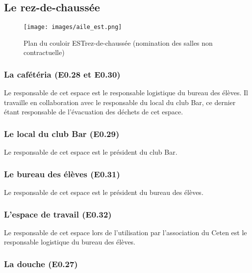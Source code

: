 \documentclass{article} %
\begin{document}
		\subsection{Le rez-de-chaussée}
\label{sub:le_rez_de_chaussee}

		\begin{figure}[]
			\centering
			\texttt{[image: images/aile\_est.png]}
			\caption{Plan du couloir EST\@ rez-de-chaussée (nomination des salles
			non contractuelle)}
\label{fig:plan}
		\end{figure}

			\subsubsection{La cafétéria (E0.28 et E0.30)}
\label{ssub:la_cafeteria_e0_28_et_e0_30_}

				Le responsable de cet espace est le responsable logistique du
				bureau des élèves. Il travaille en collaboration avec le
				responsable du local du club Bar, ce dernier étant responsable
				de l’évacuation des déchets de cet espace.

			\subsubsection{Le local du club Bar (E0.29)}
\label{ssub:le_local_du_club_bar_e0_29_}

				Le responsable de cet espace est le président du club Bar.

			\subsubsection{Le bureau des élèves (E0.31)}
\label{ssub:le_bureau_des_eleves_e0_31_}

				Le responsable de cet espace est le président du bureau des
				élèves.

			\subsubsection{L'espace de travail (E0.32)}
\label{ssub:l_espace_de_travail_e0_32_}

			Le responsable de cet espace lors de l'utilisation par 
			l'association du Ceten est le responsable logistique du
			bureau des élèves.

			\subsubsection{La douche (E0.27)}
\label{ssub:la_douche_e0_27_}
\end{document}
